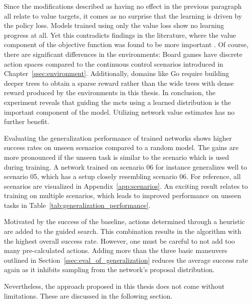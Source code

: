 Since the modifications described as having no effect in the previous paragraph all relate to value targets, it comes as no surprise that the learning is driven by the policy loss. Models trained using only the value loss show no learning progress at all. Yet this contradicts findings in the literature, where the value component of the objective function was found to be more important \cite{wangAlternativeLossFunctions2019}. Of course, there are significant differences in the environments: Board games have discrete action spaces compared to the continuous control scenarios introduced in Chapter~\ref{ssec:environment}. Additionally, domains like Go require building deeper trees to obtain a sparse reward rather than the wide trees with dense reward produced by the environments in this thesis. In conclusion, the experiment reveals that guiding the \gls{mcts} using a learned distribution is the important component of the model. Utilizing network value estimates has no further benefit.

Evaluating the generalization performance of trained networks shows higher success rates on unseen scenarios compared to a random model. The gains are more pronounced if the unseen task is similar to the scenario which is used during training. A network trained on scenario 06 for instance generalizes well to scenario 05, which has a setup closely resembling scenario 06. For reference, all scenarios are visualized in Appendix~\ref{app:scenarios}. An exciting result relates to training on multiple scenarios, which leads to improved performance on unseen tasks in Table~\ref{tab:generalization_performance}.

Motivated by the success of the baseline, actions determined through a heuristic are added to the guided search. This combination results in the algorithm with the highest overall success rate. However, one must be careful to not add too many pre-calculated actions. Adding more than the three basic maneuvers outlined in Section~\ref{ssec:eval_of_generalization} reduces the average success rate again as it inhibits sampling from the network's proposal distribution.

Nevertheless, the approach proposed in this thesis does not come without limitations. These are discussed in the following section.

